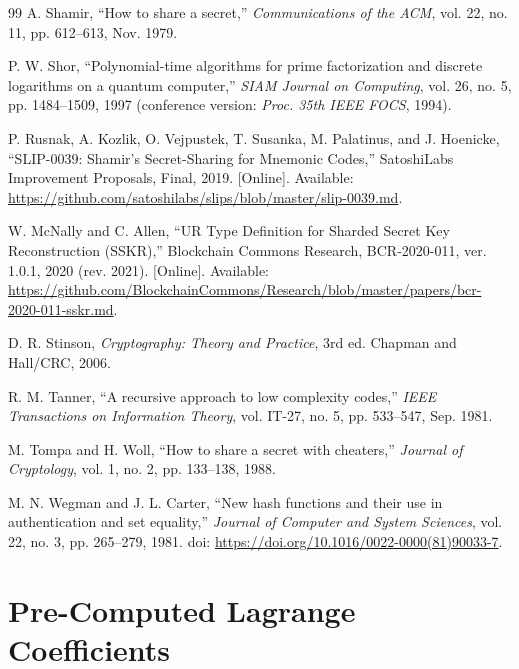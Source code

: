 \documentclass[11pt]{article}
\begin{document}
\begin{thebibliography}{99}
A. Shamir,
``How to share a secret,''
\textit{Communications of the ACM}, vol. 22, no. 11, pp. 612--613, Nov. 1979.

P. W. Shor,
``Polynomial-time algorithms for prime factorization and discrete logarithms on a quantum computer,''
\textit{SIAM Journal on Computing}, vol. 26, no. 5, pp. 1484--1509, 1997 (conference version: \textit{Proc. 35th IEEE FOCS}, 1994).

P. Rusnak, A. Kozlik, O. Vejpustek, T. Susanka, M. Palatinus, and J. Hoenicke,
``SLIP-0039: Shamir's Secret-Sharing for Mnemonic Codes,''
SatoshiLabs Improvement Proposals, Final, 2019.
[Online]. Available: \url{https://github.com/satoshilabs/slips/blob/master/slip-0039.md}.

W. McNally and C. Allen,
``UR Type Definition for Sharded Secret Key Reconstruction (SSKR),''
Blockchain Commons Research, BCR-2020-011, ver. 1.0.1, 2020
(rev. 2021). [Online]. Available: \url{https://github.com/BlockchainCommons/Research/blob/master/papers/bcr-2020-011-sskr.md}.

D. R. Stinson,
\textit{Cryptography: Theory and Practice}, 3rd ed.
Chapman and Hall/CRC, 2006.

R. M. Tanner,
``A recursive approach to low complexity codes,''
\textit{IEEE Transactions on Information Theory}, vol. IT-27, no. 5, pp. 533--547, Sep. 1981.

M. Tompa and H. Woll,
``How to share a secret with cheaters,''
\textit{Journal of Cryptology}, vol. 1, no. 2, pp. 133--138, 1988.

M. N. Wegman and J. L. Carter,
``New hash functions and their use in authentication and set equality,''
\textit{Journal of Computer and System Sciences}, vol. 22, no. 3, pp. 265--279, 1981.
doi: \url{https://doi.org/10.1016/0022-0000(81)90033-7}.

\end{thebibliography}

\appendix

\section{Pre-Computed Lagrange Coefficients}
\label{app:lagrange}
\end{document}
